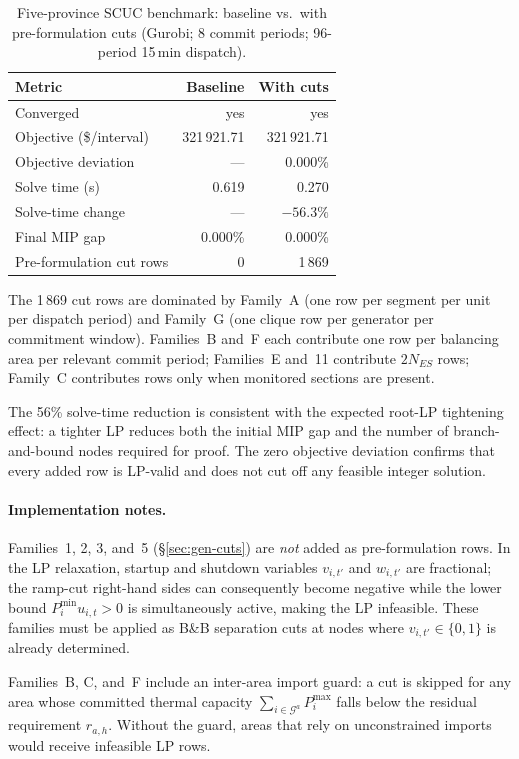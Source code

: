 \begin{table}[h]
  \centering
  \caption{Five-province SCUC benchmark: baseline vs.\ with pre-formulation
           cuts (Gurobi; 8 commit periods; 96-period 15\,min dispatch).}
  \label{tab:cuts-perf}
  \begin{tabular}{lrr}
    \toprule
    \textbf{Metric} & \textbf{Baseline} & \textbf{With cuts} \\
    \midrule
    Converged                  & yes         & yes         \\
    Objective (\$/interval)    & 321\,921.71 & 321\,921.71 \\
    Objective deviation        & ---         & 0.000\%     \\
    Solve time (s)             & 0.619       & 0.270       \\
    Solve-time change          & ---         & $-56.3\%$   \\
    Final MIP gap              & 0.000\%     & 0.000\%     \\
    Pre-formulation cut rows   & 0           & 1\,869      \\
    \bottomrule
  \end{tabular}
\end{table}

The 1\,869 cut rows are dominated by Family~A (one row per segment per unit
per dispatch period) and Family~G (one clique row per generator per
commitment window).  Families~B and~F each contribute one row per
balancing area per relevant commit period; Families~E and~11 contribute
$2N_{ES}$ rows; Family~C contributes rows only when monitored sections
are present.

The 56\% solve-time reduction is consistent with the expected root-LP
tightening effect: a tighter LP reduces both the initial MIP gap and the
number of branch-and-bound nodes required for proof.
The zero objective deviation confirms that every added row is LP-valid
and does not cut off any feasible integer solution.

\paragraph{Implementation notes.}
Families~1, 2, 3, and~5 (\S\ref{sec:gen-cuts}) are \emph{not} added as
pre-formulation rows.  In the LP relaxation, startup and shutdown
variables $v_{i,t'}$ and $w_{i,t'}$ are fractional; the ramp-cut
right-hand sides can consequently become negative while the lower bound
$P^{\min}_i u_{i,t} > 0$ is simultaneously active, making the LP
infeasible.  These families must be applied as B\&B separation cuts at
nodes where $v_{i,t'} \in \{0,1\}$ is already determined.

Families~B, C, and~F include an inter-area import guard: a cut is
skipped for any area whose committed thermal capacity
$\sum_{i \in \mathcal{G}^a} P^{\max}_i$ falls below the residual
requirement $r_{a,h}$.  Without the guard, areas that rely on
unconstrained imports would receive infeasible LP rows.

